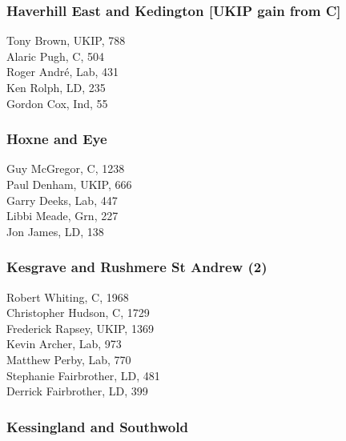\documentclass[a4paper,openany,10pt]{book}
\begin{document}
\subsubsection*{Haverhill East and Kedington \hspace*{\fill}\nolinebreak[1]%
\enspace\hspace*{\fill}
[UKIP gain from C]}



Tony Brown, UKIP, 788\\
Alaric Pugh, C, 504\\
Roger André, Lab, 431\\
Ken Rolph, LD, 235\\
Gordon Cox, Ind, 55\\


\subsubsection*{Hoxne and Eye}



Guy McGregor, C, 1238\\
Paul Denham, UKIP, 666\\
Garry Deeks, Lab, 447\\
Libbi Meade, Grn, 227\\
Jon James, LD, 138\\


\subsubsection*{Kesgrave and Rushmere St Andrew (2)}



Robert Whiting, C, 1968\\
Christopher Hudson, C, 1729\\
Frederick Rapsey, UKIP, 1369\\
Kevin Archer, Lab, 973\\
Matthew Perby, Lab, 770\\
Stephanie Fairbrother, LD, 481\\
Derrick Fairbrother, LD, 399\\


\subsubsection*{Kessingland and Southwold}
\end{document}
